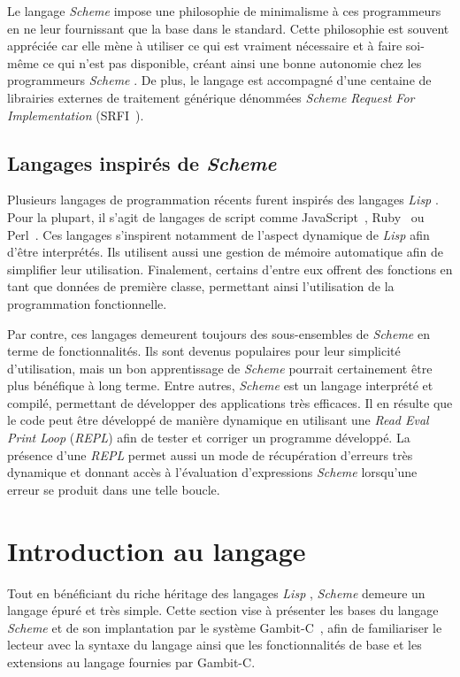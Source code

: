 \documentclass[12pt,twoside,letterpaper,francais]{book}
\newcommand{\lisp}{{\textit{Lisp }}}
\newcommand{\Schemelang}{{\textit{Scheme }}}
\begin{document}
Le langage \Schemelang impose une philosophie de minimalisme à ces
programmeurs en ne leur fournissant que la base dans le
standard. Cette philosophie est souvent appréciée car elle mène à
utiliser ce qui est vraiment nécessaire et à faire soi-même ce qui
n'est pas disponible, créant ainsi une bonne autonomie chez les
programmeurs \Schemelang. De plus, le langage est accompagné d'une
centaine de librairies externes de traitement générique dénommées
\textit{Scheme Request For Implementation} (SRFI~\cite{SRFI}).


\FloatBarrier
\subsection{Langages inspirés de \Schemelang}
Plusieurs langages de programmation récents furent inspirés des
langages \lisp. Pour la plupart, il s'agit de langages de script comme
JavaScript~\cite{ECMA-262}, Ruby~\cite{RUBY} ou Perl~\cite{PERL}. Ces
langages s'inspirent notamment de l'aspect dynamique de \lisp afin
d'être interprétés. Ils utilisent aussi une gestion de mémoire
automatique afin de simplifier leur utilisation. Finalement, certains
d'entre eux offrent des fonctions en tant que données de première
classe, permettant ainsi l'utilisation de la programmation
fonctionnelle.

Par contre, ces langages demeurent toujours des sous-ensembles de
\Schemelang en terme de fonctionnalités. Ils sont devenus populaires
pour leur simplicité d'utilisation, mais un bon apprentissage de
\Schemelang pourrait certainement être plus bénéfique à long
terme. Entre autres, \Schemelang est un langage interprété et compilé,
permettant de développer des applications très efficaces. Il en
résulte que le code peut être développé de manière dynamique en
utilisant une \textit{Read Eval Print Loop} (\textit{REPL}) afin de
tester et corriger un programme développé. La présence d'une
\textit{REPL} permet aussi un mode de récupération d'erreurs très
dynamique et donnant accès à l'évaluation d'expressions \Schemelang
lorsqu'une erreur se produit dans une telle boucle.


\FloatBarrier
\section{Introduction au langage}
Tout en bénéficiant du riche héritage des langages \lisp, \Schemelang
demeure un langage épuré et très simple. Cette section vise à
présenter les bases du langage \Schemelang et de son implantation par
le système Gambit-C~\cite{Gambit4}, afin de familiariser le lecteur
avec la syntaxe du langage ainsi que les fonctionnalités de base et
les extensions au langage fournies par Gambit-C.
\end{document}
